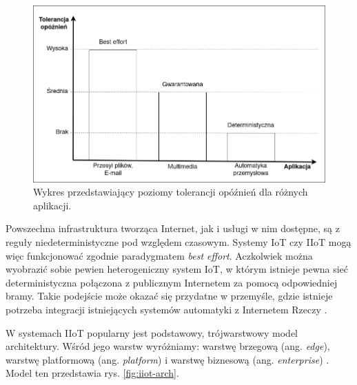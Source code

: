 \documentclass[a4paper, 12pt, twoside]{article}
\begin{document}
\begin{figure}[h]
    \centering
    \includegraphics[scale=0.45]{tolerancja.png}
    \caption{Wykres przedstawiający poziomy tolerancji opóźnień dla różnych aplikacji.}
    \label{fig:tolerancja}
\end{figure}

Powszechna infrastruktura tworząca Internet, jak i usługi w nim dostępne, są z reguły
niedeterministyczne pod względem czasowym. Systemy IoT czy IIoT mogą więc
funkcjonować zgodnie paradygmatem \emph{best effort}. Aczkolwiek można wyobrazić
sobie pewien heterogeniczny system
IoT, w którym istnieje pewna sieć deterministyczna połączona z publicznym Internetem
za pomocą odpowiedniej bramy. Takie podejście może okazać się przydatne w przemyśle, gdzie
istnieje potrzeba integracji istniejących systemów automatyki z Internetem Rzeczy \cite{iiot-design-and-impl-gateway}.

W systemach IIoT popularny jest podstawowy, trójwarstwowy model architektury. Wśród jego
warstw wyróżniamy: warstwę brzegową (ang. \emph{edge}), warstwę platformową (ang. \emph{platform})
i warstwę biznesową (ang. \emph{enterprise}) \cite{iiot-challenges-opportunities-directions}.
Model ten przedstawia rys. \ref{fig:iiot-arch}.
\end{document}
